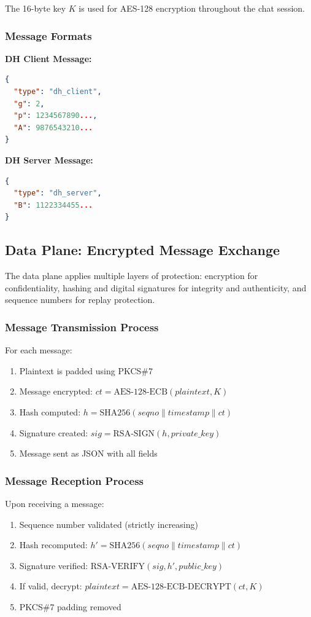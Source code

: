 \documentclass[runningheads]{llncs}
\begin{document}
The 16-byte key $K$ is used for AES-128 encryption throughout the chat session.

\subsubsection{Message Formats}

\textbf{DH Client Message:}
\begin{lstlisting}[language=json]
{
  "type": "dh_client",
  "g": 2,
  "p": 1234567890...,
  "A": 9876543210...
}
\end{lstlisting}

\textbf{DH Server Message:}
\begin{lstlisting}[language=json]
{
  "type": "dh_server",
  "B": 1122334455...
}
\end{lstlisting}

\subsection{Data Plane: Encrypted Message Exchange}

The data plane applies multiple layers of protection: encryption for confidentiality, hashing and digital signatures for integrity and authenticity, and sequence numbers for replay protection.

\subsubsection{Message Transmission Process}

For each message:
\begin{enumerate}
    \item Plaintext is padded using PKCS\#7
    \item Message encrypted: $ct = \text{AES-128-ECB}(plaintext, K)$
    \item Hash computed: $h = \text{SHA256}(seqno \| timestamp \| ct)$
    \item Signature created: $sig = \text{RSA-SIGN}(h, private\_key)$
    \item Message sent as JSON with all fields
\end{enumerate}

\subsubsection{Message Reception Process}

Upon receiving a message:
\begin{enumerate}
    \item Sequence number validated (strictly increasing)
    \item Hash recomputed: $h' = \text{SHA256}(seqno \| timestamp \| ct)$
    \item Signature verified: $\text{RSA-VERIFY}(sig, h', public\_key)$
    \item If valid, decrypt: $plaintext = \text{AES-128-ECB-DECRYPT}(ct, K)$
    \item PKCS\#7 padding removed
\end{enumerate}
\end{document}
